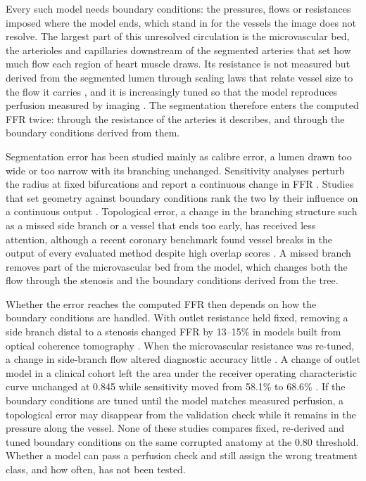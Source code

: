 \documentclass[journal]{IEEEtran}
\begin{document}
Every such model needs boundary conditions: the pressures, flows or resistances imposed where the model ends, which
stand in for the vessels the image does not resolve. The largest part of this unresolved circulation is the
microvascular bed, the arterioles and capillaries downstream of the segmented arteries that set how much flow each
region of heart muscle draws. Its resistance is not measured but derived from the segmented lumen through scaling
laws that relate vessel size to the flow it carries \cite{murray1926,kim2010}, and it is increasingly tuned so that
the model reproduces perfusion measured by imaging \cite{menon2024}. The segmentation therefore enters the computed
FFR twice: through the resistance of the arteries it describes, and through the boundary conditions derived from
them.

Segmentation error has been studied mainly as calibre error, a lumen drawn too wide or too narrow with its branching
unchanged. Sensitivity analyses perturb the radius at fixed bifurcations and report a continuous change in FFR
\cite{sankaran2015tmi,sankaran2015cmame,fernandez2024,dalmaso2025}. Studies that set geometry against boundary
conditions rank the two by their influence on a continuous output \cite{sankaran2016,tanade2022,colebank2019,korte2023}. Topological error, a change in the
branching structure such as a missed side branch or a vessel that ends too early, has received less attention,
although a recent coronary benchmark found vessel breaks in the output of every evaluated method despite high
overlap scores \cite{bransby2026}. A missed branch removes part of the microvascular bed from the model, which
changes both the flow through the stenosis and the boundary conditions derived from the tree.

Whether the error reaches the computed FFR then depends on how the boundary conditions are handled. With outlet
resistance held fixed, removing a side branch distal to a stenosis changed FFR by 13--15\% in models built from
optical coherence tomography \cite{gamage2022}. When the microvascular resistance was re-tuned, a change in
side-branch flow altered diagnostic accuracy little \cite{gosling2020}. A change of outlet model in a clinical cohort
left the area under the receiver operating characteristic curve unchanged at 0.845 while sensitivity moved from
58.1\% to 68.6\% \cite{fossan2026}. If the boundary conditions are tuned until the model matches measured perfusion, a topological error may disappear from the
validation check while it remains in the pressure along the vessel. None of these studies compares fixed,
re-derived and tuned boundary conditions on the same corrupted anatomy at the 0.80 threshold. Whether a model can
pass a perfusion check and still assign the wrong treatment class, and how often, has not been tested.
\end{document}
